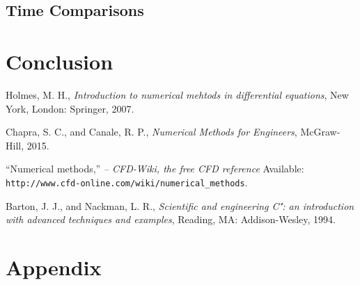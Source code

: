 \documentclass[]{aiaa-tc}%
\begin{document}
\begin{figure}[htb]
\begin{subfigmatrix}{2}
  \end{subfigmatrix}
 \label{f:p_convergeplot}
\end{figure}

\FloatBarrier\subsection{Time Comparisons}

\FloatBarrier\subsection{}

\FloatBarrier\section{Conclusion}



\begin{thebibliography}{9}%
 Holmes, M. H., {\it Introduction to numerical mehtods in differential equations}, New York, London: Springer, 2007.

Chapra, S. C., and Canale, R. P., {\it Numerical Methods for Engineers}, McGraw-Hill, 2015.

“Numerical methods,” {\it -- CFD-Wiki, the free CFD reference} Available: \verb+http://www.cfd-online.com/wiki/numerical_methods+.

Barton, J. J., and Nackman, L. R., {\it Scientific and engineering C⁺: an introduction with advanced techniques and examples}, Reading, MA: Addison-Wesley, 1994.

\end{thebibliography}

\section*{Appendix}

\end{document}
